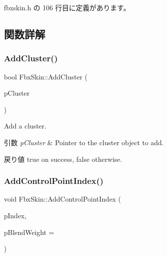  fbxskin.\+h の 106 行目に定義があります。



\subsection{関数詳解}
\mbox{\label{class_fbx_skin_a6eb5b55faf155b9c63f33c1ebf418508}} 
\subsubsection{\texorpdfstring{Add\+Cluster()}{AddCluster()}}
{\footnotesize\ttfamily bool Fbx\+Skin\+::\+Add\+Cluster (\begin{DoxyParamCaption}\item[{\hyperlink{class_fbx_cluster}{Fbx\+Cluster} $\ast$}]{p\+Cluster }\end{DoxyParamCaption})}

Add a cluster. 
\begin{DoxyParams}{引数}
{\em p\+Cluster} & Pointer to the cluster object to add. \\
\hline
\end{DoxyParams}
\begin{DoxyReturn}{戻り値}
{\ttfamily true} on success, {\ttfamily false} otherwise. 
\end{DoxyReturn}
\mbox{\label{class_fbx_skin_a23b0bc74cd2a08e2387d8619f59bb4f3}} 
\subsubsection{\texorpdfstring{Add\+Control\+Point\+Index()}{AddControlPointIndex()}}
{\footnotesize\ttfamily void Fbx\+Skin\+::\+Add\+Control\+Point\+Index (\begin{DoxyParamCaption}\item[{int}]{p\+Index,  }\item[{double}]{p\+Blend\+Weight = {} }\end{DoxyParamCaption})}

